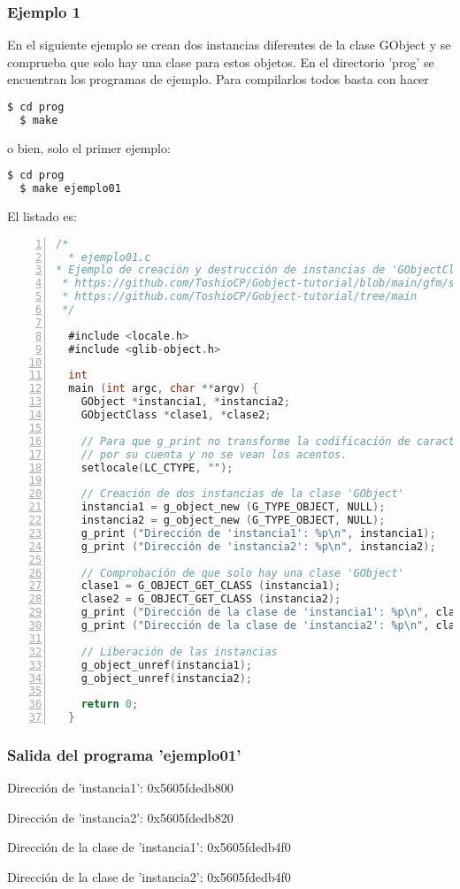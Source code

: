 \subsubsection{Ejemplo 1}
En el siguiente ejemplo se crean dos instancias diferentes de la clase \textsf{GObject} y se comprueba que
solo hay una clase para estos objetos. En el directorio 'prog' se encuentran los programas de ejemplo.
Para compilarlos todos basta con hacer
\begin{lstlisting}[language=bash]
  $ cd prog
  $ make
\end{lstlisting}
o bien, solo el primer ejemplo:
\begin{lstlisting}[language=bash]
  $ cd prog
  $ make ejemplo01
\end{lstlisting}

El listado es:
\begin{lstlisting}[language=C, numbers=left]
/*
  * ejemplo01.c
* Ejemplo de creación y destrucción de instancias de 'GObjectClass'.
 * https://github.com/ToshioCP/Gobject-tutorial/blob/main/gfm/sec2.md
 * https://github.com/ToshioCP/Gobject-tutorial/tree/main
 */

  #include <locale.h>
  #include <glib-object.h>

  int
  main (int argc, char **argv) {
    GObject *instancia1, *instancia2;
    GObjectClass *clase1, *clase2;

    // Para que g_print no transforme la codificación de caracteres
    // por su cuenta y no se vean los acentos.
    setlocale(LC_CTYPE, "");

    // Creación de dos instancias de la clase 'GObject'
    instancia1 = g_object_new (G_TYPE_OBJECT, NULL);
    instancia2 = g_object_new (G_TYPE_OBJECT, NULL);
    g_print ("Dirección de 'instancia1': %p\n", instancia1);
    g_print ("Dirección de 'instancia2': %p\n", instancia2);

    // Comprobación de que solo hay una clase 'GObject'
    clase1 = G_OBJECT_GET_CLASS (instancia1);
    clase2 = G_OBJECT_GET_CLASS (instancia2);
    g_print ("Dirección de la clase de 'instancia1': %p\n", clase1);
    g_print ("Dirección de la clase de 'instancia2': %p\n", clase2);

    // Liberación de las instancias
    g_object_unref(instancia1);
    g_object_unref(instancia2);

    return 0;
  }
\end{lstlisting}

\subsubsection{Salida del programa 'ejemplo01'}
\textsf{Dirección de 'instancia1': 0x5605fdedb800}\par
\textsf{Dirección de 'instancia2': 0x5605fdedb820}\par
\textsf{Dirección de la clase de 'instancia1':  0x5605fdedb4f0}\par
\textsf{Dirección de la clase de 'instancia2':  0x5605fdedb4f0}\par


